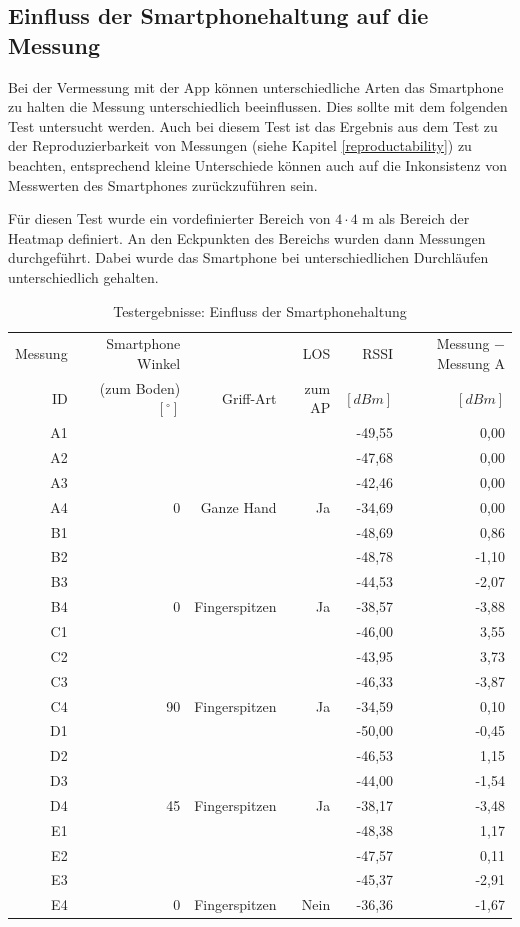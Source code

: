 \documentclass[10pt]{scrartcl}
\begin{document}
\subsection{Einfluss der Smartphonehaltung auf die Messung}
Bei der Vermessung mit der App können unterschiedliche Arten das Smartphone zu halten die Messung unterschiedlich beeinflussen. Dies sollte mit dem folgenden Test untersucht werden. Auch bei diesem Test ist das Ergebnis aus dem Test zu der Reproduzierbarkeit von Messungen (siehe Kapitel \ref{reproductability}) zu beachten, entsprechend kleine Unterschiede können auch auf die Inkonsistenz von Messwerten des Smartphones zurückzuführen sein.

Für diesen Test wurde ein vordefinierter Bereich von $4\cdot 4$ m als Bereich der Heatmap definiert. An den Eckpunkten des Bereichs wurden dann Messungen durchgeführt. Dabei wurde das Smartphone bei unterschiedlichen Durchläufen unterschiedlich gehalten.

\begin{table}
\centering
\begin{tabular}{|r|r|r|r|r|r|}
\hline
Messung & Smartphone Winkel & & LOS & RSSI & Messung $-$ Messung A\\
ID & (zum Boden) $[^\circ]$ & Griff-Art & zum AP & $[dBm]$ & $[dBm]$\\\hline

A1 & & & & -49,55 & 0,00 \\
A2 & & & & -47,68 & 0,00 \\
A3 & & & & -42,46 & 0,00 \\
A4 & 0 & Ganze Hand & Ja & -34,69 & 0,00 \\\hline

B1 & & & & -48,69 & 0,86 \\
B2 & & & & -48,78 & -1,10 \\
B3 & & & & -44,53 & -2,07 \\
B4 & 0 & Fingerspitzen & Ja & -38,57 & -3,88 \\\hline

C1 & & & & -46,00 & 3,55 \\
C2 & & & & -43,95 & 3,73 \\
C3 & & & & -46,33 & -3,87 \\
C4 & 90 & Fingerspitzen & Ja & -34,59 & 0,10 \\\hline

D1 & & & & -50,00 & -0,45 \\
D2 & & & & -46,53 & 1,15 \\
D3 & & & & -44,00 & -1,54 \\
D4 & 45 & Fingerspitzen & Ja & -38,17 & -3,48 \\\hline

E1 & & & & -48,38 & 1,17 \\
E2 & & & & -47,57 & 0,11 \\
E3 & & & & -45,37 & -2,91 \\
E4 & 0 & Fingerspitzen & Nein & -36,36 & -1,67 \\\hline

\end{tabular}
\caption{\label{tab:smartphonepose}Testergebnisse: Einfluss der Smartphonehaltung}
\end{table}
\end{document}
